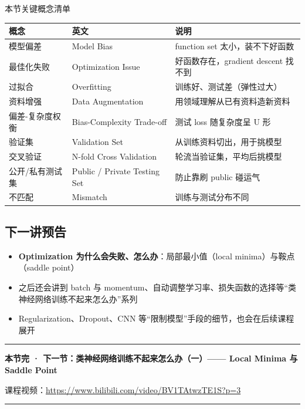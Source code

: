 \documentclass[a4paper]{article}
\newcommand{\videourl}{https://www.bilibili.com/video/BV1TAtwzTE1S?p=3}
\begin{document}
\begin{knowledgebox}{本节关键概念清单}
    \begin{center}
    \begin{tabular}{lll}
        \toprule
        \textbf{概念} & \textbf{英文} & \textbf{说明} \\
        \midrule
        模型偏差 & Model Bias & function set 太小，装不下好函数 \\
        最佳化失败 & Optimization Issue & 好函数存在，gradient descent 找不到 \\
        过拟合 & Overfitting & 训练好、测试差（弹性过大） \\
        资料增强 & Data Augmentation & 用领域理解从已有资料造新资料 \\
        偏差-复杂度权衡 & Bias-Complexity Trade-off & 测试 loss 随复杂度呈 U 形 \\
        验证集 & Validation Set & 从训练资料切出，用于挑模型 \\
        交叉验证 & N-fold Cross Validation & 轮流当验证集，平均后挑模型 \\
        公开/私有测试集 & Public / Private Testing Set & 防止靠刷 public 碰运气 \\
        不匹配 & Mismatch & 训练与测试分布不同 \\
        \bottomrule
    \end{tabular}
    \end{center}
\end{knowledgebox}

\subsection{下一讲预告}

\begin{itemize}
    \item \textbf{Optimization 为什么会失败、怎么办}：局部最小值（local minima）与鞍点（saddle point）
    \item 之后还会讲到 batch 与 momentum、自动调整学习率、损失函数的选择等``类神经网络训练不起来怎么办''系列
    \item Regularization、Dropout、CNN 等``限制模型''手段的细节，也会在后续课程展开
\end{itemize}

\vspace{1cm}

\begin{center}
    \rule{0.5\textwidth}{0.5pt}
    \vspace{0.3cm}

    \textbf{本节完 · 下一节：类神经网络训练不起来怎么办（一）—— Local Minima 与 Saddle Point}

    课程视频：\href{\videourl}{\videourl}

    \vspace{0.3cm}
    \rule{0.5\textwidth}{0.5pt}
\end{center}
\end{document}
